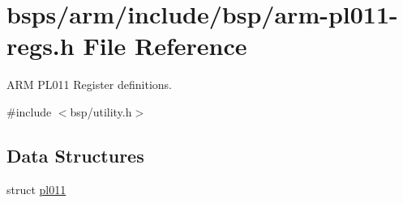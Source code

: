 \hypertarget{arm-pl011-regs_8h}{}\section{bsps/arm/include/bsp/arm-\/pl011-\/regs.h File Reference}
\label{arm-pl011-regs_8h}


A\+RM P\+L011 Register definitions.  


{\ttfamily \#include $<$bsp/utility.\+h$>$}\newline
\subsection*{Data Structures}
\begin{DoxyCompactItemize}
\item 
struct \mbox{\hyperlink{structpl011}{pl011}}
\end{DoxyCompactItemize}
